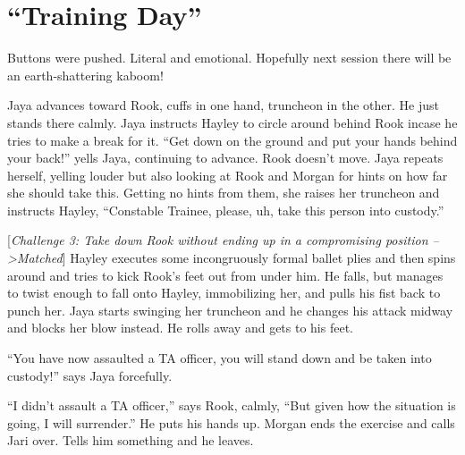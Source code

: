 \setcounter{chapter}{ 17 }
\chapter{\textbf{``Training Day'' } }









Buttons were pushed.  Literal and emotional.  Hopefully next session there will be an earth-shattering kaboom!  





Jaya advances toward Rook, cuffs in one hand, truncheon in the other.  He just stands there calmly.  Jaya instructs Hayley to circle around behind Rook incase he tries to make a break for it.  ``Get down on the ground and put your hands behind your back!'' yells Jaya, continuing to advance.  Rook doesn't move.  Jaya repeats herself, yelling louder but also looking at Rook and Morgan for hints on how far she should take this.  Getting no hints from them, she raises her truncheon and instructs Hayley, ``Constable Trainee, please, uh, take this person into custody.''



{[}\textit{Challenge 3: Take down Rook without ending up in a compromising position --\textgreater  Matched}{]}  Hayley executes some incongruously formal ballet plies and then spins around and tries to kick Rook's feet out from under him.  He falls, but manages to twist enough to fall onto Hayley, immobilizing her, and pulls his fist back to punch her.  Jaya starts swinging her truncheon and he changes his attack midway and blocks her blow instead.  He rolls away and gets to his feet.



``You have now assaulted a TA officer, you will stand down and be taken into custody!'' says Jaya forcefully.



``I didn't assault a TA officer,'' says Rook, calmly, ``But given how the situation is going, I will surrender.''  He puts his hands up.  Morgan ends the exercise and calls Jari over.  Tells him something and he leaves.



